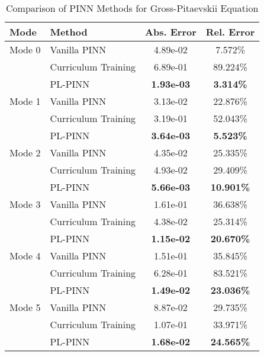 \begin{table}[htbp]
\centering
\caption{Comparison of PINN Methods for Gross-Pitaevskii Equation}
\label{tab:pinn_comparison}
\begin{tabular}{llcc}
\toprule
Mode & Method & Abs. Error & Rel. Error \\
\midrule
Mode 0 & Vanilla PINN & 4.89e-02 & 7.572\% \\
 & Curriculum Training & 6.89e-01 & 89.224\% \\
 & PL-PINN & \textbf{1.93e-03} & \textbf{3.314\%} \\
\midrule
Mode 1 & Vanilla PINN & 3.13e-02 & 22.876\% \\
 & Curriculum Training & 3.19e-01 & 52.043\% \\
 & PL-PINN & \textbf{3.64e-03} & \textbf{5.523\%} \\
\midrule
Mode 2 & Vanilla PINN & 4.35e-02 & 25.335\% \\
 & Curriculum Training & 4.93e-02 & 29.409\% \\
 & PL-PINN & \textbf{5.66e-03} & \textbf{10.901\%} \\
\midrule
Mode 3 & Vanilla PINN & 1.61e-01 & 36.638\% \\
 & Curriculum Training & 4.38e-02 & 25.314\% \\
 & PL-PINN & \textbf{1.15e-02} & \textbf{20.670\%} \\
\midrule
Mode 4 & Vanilla PINN & 1.51e-01 & 35.845\% \\
 & Curriculum Training & 6.28e-01 & 83.521\% \\
 & PL-PINN & \textbf{1.49e-02} & \textbf{23.036\%} \\
\midrule
Mode 5 & Vanilla PINN & 8.87e-02 & 29.735\% \\
 & Curriculum Training & 1.07e-01 & 33.971\% \\
 & PL-PINN & \textbf{1.68e-02} & \textbf{24.565\%} \\
\bottomrule
\end{tabular}
\end{table}
